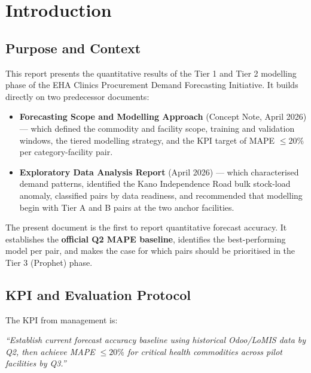 \documentclass[12pt, a4paper]{article}
\begin{document}
\newpage
\tableofcontents
\newpage

\section{Introduction}

\subsection{Purpose and Context}

This report presents the quantitative results of the Tier 1 and Tier 2
modelling phase of the EHA Clinics Procurement Demand Forecasting
Initiative. It builds directly on two predecessor documents:

\begin{itemize}[leftmargin=1.5em, itemsep=3pt]
  \item \textbf{Forecasting Scope and Modelling Approach} (Concept Note,
        April 2026) --- which defined the commodity and facility scope,
        training and validation windows, the tiered modelling strategy,
        and the KPI target of MAPE $\leq 20\%$ per category-facility pair.

  \item \textbf{Exploratory Data Analysis Report} (April 2026) --- which
        characterised demand patterns, identified the Kano Independence
        Road bulk stock-load anomaly, classified pairs by data readiness,
        and recommended that modelling begin with Tier A and B pairs at the
        two anchor facilities.
\end{itemize}

The present document is the first to report quantitative forecast accuracy.
It establishes the \textbf{official Q2 MAPE baseline}, identifies the
best-performing model per pair, and makes the case for which pairs should
be prioritised in the Tier 3 (Prophet) phase.

\subsection{KPI and Evaluation Protocol}

The KPI from management is:

\begin{mdframed}[style=keybox]
\textit{``Establish current forecast accuracy baseline using historical
Odoo/LoMIS data by Q2, then achieve MAPE $\leq 20\%$ for critical health
commodities across pilot facilities by Q3.''}
\end{mdframed}
\end{document}

